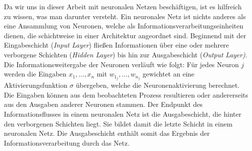 Da wir uns in dieser Arbeit mit neuronalen Netzen beschäftigen, ist es hilfreich zu wissen, was man darunter versteht. Ein neuronales Netz ist nichts anderes als eine Ansammlung von Neuronen, welche als Informationsverarbeitungseinheiten dienen, die schichtweise in einer Architektur angeordnet sind. Beginnend mit der Eingabeschicht (\textit{Input Layer}) fließen Informationen über eine oder mehrere verborgene Schichten (\textit{Hidden Layer}) bis hin zur Ausgabeschicht (\textit{Output Layer)}. Die Informationsweitergabe der Neuronen verläuft wie folgt: Für jedes Neuron $j$ werden die Eingaben $x_1,\dots,x_n$ mit $w_{1_j}, \dots, w_{n_j}$ gewichtet an eine Aktivierungsfunktion $\sigma$ übergeben, welche die Neuronenaktivierung berechnet. Die Eingaben können aus dem beobachteten Prozess resultieren oder andererseits aus den Ausgaben anderer Neuronen stammen. 
Der Endpunkt des Informationsflusses in einem neuronalen Netz ist die Ausgabeschicht, die hinter den verborgenen Schichten liegt. Sie bildet damit die letzte Schicht in einem neuronalen Netz. Die Ausgabeschicht enthält somit das Ergebnis der Informationsverarbeitung durch das Netz.  
%        
%        
